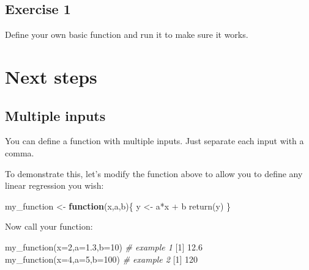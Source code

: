 \documentclass[
]{book}
\newenvironment{Shaded}{\begin{snugshade}}{\end{snugshade}}
\newcommand{\AttributeTok}[1]{\textcolor[rgb]{0.77,0.63,0.00}{#1}}
\newcommand{\CommentTok}[1]{\textcolor[rgb]{0.56,0.35,0.01}{\textit{#1}}}
\newcommand{\ControlFlowTok}[1]{\textcolor[rgb]{0.13,0.29,0.53}{\textbf{#1}}}
\newcommand{\DecValTok}[1]{\textcolor[rgb]{0.00,0.00,0.81}{#1}}
\newcommand{\FloatTok}[1]{\textcolor[rgb]{0.00,0.00,0.81}{#1}}
\newcommand{\FunctionTok}[1]{\textcolor[rgb]{0.00,0.00,0.00}{#1}}
\newcommand{\NormalTok}[1]{#1}
\newcommand{\OtherTok}[1]{\textcolor[rgb]{0.56,0.35,0.01}{#1}}
\newcommand{\SpecialCharTok}[1]{\textcolor[rgb]{0.00,0.00,0.00}{#1}}
\begin{document}
\hypertarget{exercise-1-5}{%
\subsection*{Exercise 1}\label{exercise-1-5}}

Define your own basic function and run it to make sure it works.

\hypertarget{next-steps}{%
\section*{Next steps}\label{next-steps}}

\hypertarget{multiple-inputs}{%
\subsection*{Multiple inputs}\label{multiple-inputs}}

You can define a function with multiple inputs. Just separate each input with a comma.

To demonstrate this, let's modify the function above to allow you to define any linear regression you wish:

\begin{Shaded}
\begin{Highlighting}[]
\NormalTok{my\_function }\OtherTok{\textless{}{-}} \ControlFlowTok{function}\NormalTok{(x,a,b)\{}
\NormalTok{  y }\OtherTok{\textless{}{-}}\NormalTok{ a}\SpecialCharTok{*}\NormalTok{x }\SpecialCharTok{+}\NormalTok{ b}
  \FunctionTok{return}\NormalTok{(y)}
\NormalTok{\}}
\end{Highlighting}
\end{Shaded}

Now call your function:

\begin{Shaded}
\begin{Highlighting}[]
\FunctionTok{my\_function}\NormalTok{(}\AttributeTok{x=}\DecValTok{2}\NormalTok{,}\AttributeTok{a=}\FloatTok{1.3}\NormalTok{,}\AttributeTok{b=}\DecValTok{10}\NormalTok{) }\CommentTok{\# example 1}
\NormalTok{[}\DecValTok{1}\NormalTok{] }\FloatTok{12.6}
\FunctionTok{my\_function}\NormalTok{(}\AttributeTok{x=}\DecValTok{4}\NormalTok{,}\AttributeTok{a=}\DecValTok{5}\NormalTok{,}\AttributeTok{b=}\DecValTok{100}\NormalTok{) }\CommentTok{\# example 2}
\NormalTok{[}\DecValTok{1}\NormalTok{] }\DecValTok{120}
\end{Highlighting}
\end{Shaded}
\end{document}
